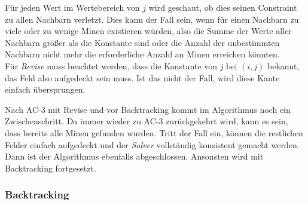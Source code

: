 Für jeden Wert im Wertebereich von $j$ wird geschaut, ob dies seinen Constraint
zu allen Nachbarn verletzt. Dies kann der Fall sein, wenn für einen Nachbarn zu viele oder zu wenige Minen existieren würden, also die Summe
der Werte aller Nachbarn größer als die Konstante sind oder die Anzahl der unbestimmten Nachbarn nicht mehr die erforderliche Anzahl an Minen 
erreichen könnten.\\
Für \textit{Revise} muss beachtet werden, dass die Konstante von $j$ bei $(i,j)$ bekannt, das Feld also aufgedeckt sein muss. Ist
das nicht der Fall, wird diese Kante einfach übersprungen.

Nach AC-3 mit Revise und vor Backtracking kommt im Algorithmus noch ein Zwischenschritt. Da immer wieder zu AC-3 zurückgekehrt wird, kann es 
sein, dass bereits alle Minen gefunden wurden. Tritt der Fall ein, können die restlichen Felder einfach aufgedeckt und der \textit{Solver}
vollständig konsistent gemacht werden. Dann ist der Algorithmus ebenfalls abgeschlossen. Ansonsten wird mit Backtracking fortgesetzt.

\subsubsection{Backtracking}

